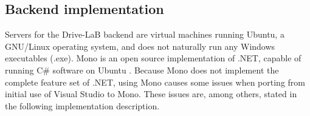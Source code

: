 \subsection{Backend implementation}\label{subsec:backend_impl}
Servers for the Drive-LaB backend are virtual machines running Ubuntu, a GNU/Linux operating system, and does not naturally run any Windows executables (.exe). Mono is an open source implementation of .NET, capable of running C\# software on Ubuntu \citep{mono}. Because Mono does not implement the complete feature set of .NET, using Mono causes some issues when porting from initial use of Visual Studio to Mono. These issues are, among others, stated in the following implementation description. 


